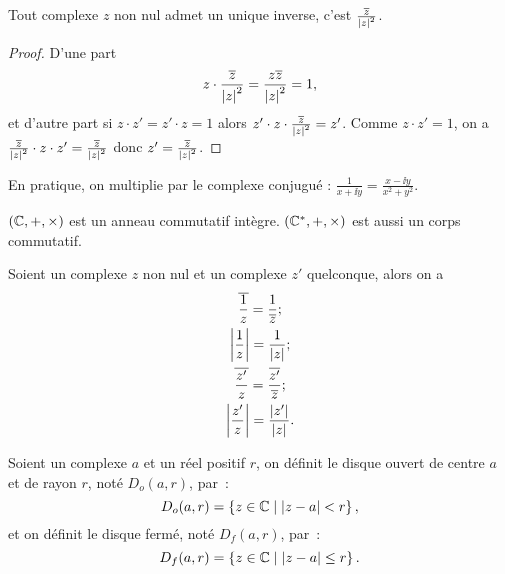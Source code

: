 %
\begin{prop}
  Tout complexe $z$ non nul admet un unique inverse, c'est $\frac{\overline{z}}{\left\lvert z\right\rvert^2}$.
\end{prop}
\begin{proof}
  D'une part
  \begin{equation}
    z \cdot \frac{\overline{z}}{\left\lvert z\right\rvert^2}=\frac{z \overline{z}}{\left\lvert z\right\rvert^2}=1,
  \end{equation}
  et d'autre part si $z\cdot z'=z'\cdot z=1$ alors $z'\cdot z\cdot \frac{\overline{z}}{\left\lvert z\right\rvert^2}=z'$. Comme $z\cdot z'=1$, on a $ \frac{\overline{z}}{\left\lvert z\right\rvert^2}\cdot z\cdot z'=\frac{\overline{z}}{\left\lvert z\right\rvert^2}$ donc $z'=\frac{\overline{z}}{\left\lvert z\right\rvert^2}$.
\end{proof}
En pratique, on multiplie par le complexe conjugué : $\frac{1}{x+\ii y}=\frac{x -\ii y}{x^2+y^2}$.
%
\begin{prop}
  $(\mathbb{C},+,\times)$ est un anneau commutatif intègre. $(\mathbb{C}^*,+,\times)$ est aussi un corps commutatif.
\end{prop}
%
\begin{prop}
  Soient un complexe $z$ non nul et un complexe $z'$ quelconque, alors on a
  \begin{gather}
    \overline{\frac{1}{z}}=\frac{1}{\overline{z}}; \\
    \left\lvert\frac{1}{z}\right\rvert=\frac{1}{\left\lvert z\right\rvert}; \\
    \overline{\frac{z'}{z}} = \frac{\overline{z'}}{\overline{z}};\\
    \left\lvert\frac{z'}{z}\right\rvert=\frac{\left\lvert z'\right\rvert}{\left\lvert z\right\rvert}.
  \end{gather}
\end{prop}
%
\begin{defdef}
  Soient un complexe $a$ et un réel positif $r$, on définit le disque ouvert de centre $a$ et de rayon $r$, noté $D_o(a,r)$, par~:
  \begin{equation}
    D_o(a,r)=\left\{z\in\mathbb{C}\mathrel{}\middle|\mathrel{}\left\lvert z-a\right\rvert<r\right\},
  \end{equation}
  et on définit le disque fermé, noté $D_f(a,r)$, par~:
  \begin{equation}
    D_f(a,r)=\left\{z\in\mathbb{C}\mathrel{}\middle|\mathrel{}\left\lvert z-a\right\rvert\leq r\right\}.
  \end{equation}
\end{defdef}
%
